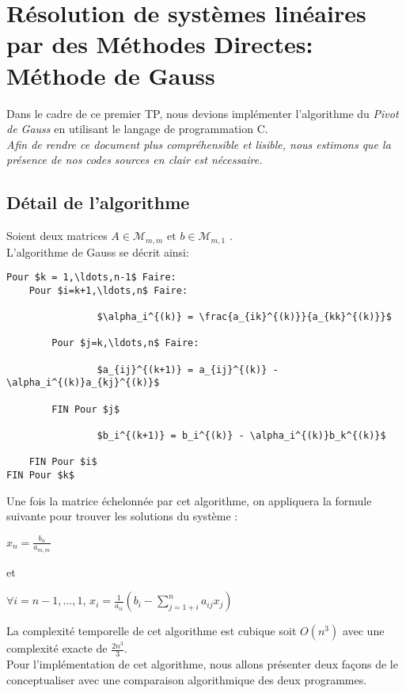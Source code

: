 \chapter{Résolution de systèmes linéaires par des Méthodes Directes: Méthode de Gauss}
Dans le cadre de ce premier TP, nous devions implémenter l'algorithme du \emph{Pivot de Gauss} en utilisant le langage de programmation C.\\
\textit{Afin de rendre ce document plus compréhensible et lisible, nous estimons que la présence de nos codes sources en clair est nécessaire.} \\
\section{Détail de l'algorithme}
Soient deux matrices $A \in \mathcal{M}_{m,m} \text{ et  } b \in \mathcal{M}_{m,1}$ . \\
L'algorithme de Gauss se décrit ainsi: \\
\label{algo}
\begin{lstlisting}[mathescape=true, frame=single]
Pour $k = 1,\ldots,n-1$ Faire:
	Pour $i=k+1,\ldots,n$ Faire:

				$\alpha_i^{(k)} = \frac{a_{ik}^{(k)}}{a_{kk}^{(k)}}$ 
		
		Pour $j=k,\ldots,n$ Faire:

		   		$a_{ij}^{(k+1)} = a_{ij}^{(k)} - \alpha_i^{(k)}a_{kj}^{(k)}$
	
		FIN Pour $j$

				$b_i^{(k+1)} = b_i^{(k)} - \alpha_i^{(k)}b_k^{(k)}$

	FIN Pour $i$
FIN Pour $k$
\end{lstlisting}
\newpage
Une fois la matrice échelonnée par cet algorithme, on appliquera la formule suivante pour trouver les solutions du système : \\
\begin{mdframed}
\begin{center}
\begin{large}
$ x_n = \frac{b_n}{a_{m,m}}$ \\
\end{large}
\end{center}
et \\
\begin{center}
\begin{large}
$ \forall i = n-1, \ldots, 1$, $x_i = \frac{1}{a_{ii}}\left( b_i-\sum\limits_{j=1+i}^n a_{ij}x_j \right)$\\
\end{large}
\end{center}
\end{mdframed}
La complexité temporelle de cet algorithme est cubique soit $O(n^3)$ avec une complexité exacte de $\frac{2n^3}{3}$. \\
Pour l'implémentation de cet algorithme, nous allons présenter deux façons de le conceptualiser avec une comparaison algorithmique des deux programmes. \\
